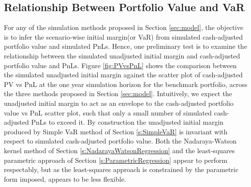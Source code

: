 \documentclass[preprint,12pt]{elsarticle}
\begin{document}
\subsection{Relationship Between Portfolio Value and VaR}\label{s:PvAndVaR}

For any of the simulation methods proposed in Section \ref{sec:model}, the objective is to infer the scenario-wise initial margin(or VaR) from simulated cash-adjusted portfolio value and simulated PnLs. Hence, one preliminary test is to examine the relationship between the simulated unadjusted initial margin and cash-adjusted portfolio value and PnLs. Figure \ref{fig:PVvsPnL} shows the comparison between the simulated unadjusted initial margin against the scatter plot of cash-adjusted PV vs PnL at the one year simulation horizon for the benchmark portfolio, across the three methods proposed in Section \ref{sec:model}. Intuitively, we expect the unadjusted initial margin to act as an envelope to the cash-adjusted portfolio value vs PnL scatter plot, such that only a small number of simulated cash-adjusted PnLs to exceed it. By construction the unadjusted initial margin produced by Simple VaR method of Section \ref{s:SimpleVaR} is invariant with respect to simulated cash-adjusted portfolio value. Both the Nadaraya-Watson kernel method of Section \ref{s:NadarayaWatsonRegression} and the least-squares parametric approach of Section \ref{s:ParametricRegression} appear to perform respectably, but as the least-squares approach is constrained by the parametric form imposed, appears to be less flexible.
\end{document}
